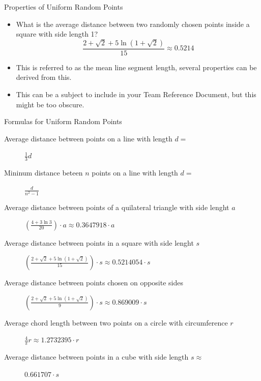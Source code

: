 \documentclass[11pt,pdf, aspectratio=169]{beamer}
\begin{document}
  \begin{frame}{Properties of Uniform Random Points}
    \begin{itemize}
      \item What is the average distance between two randomly chosen points inside a square with side length 1?\\
      \[
        \frac{2 + \sqrt {2} + 5 \ln\left(1 + \sqrt {2}\right)}{15} \approx 0.5214
      \]
      \item This is referred to as the mean line segment length, several properties can be derived from this.
      \item This can be a subject to include in your Team Reference Document, but this might be too obscure.
    \end{itemize}
  \end{frame}
  \begin{frame}{Formulas for Uniform Random Points} %
    \begin{description}
      \item[Average distance between points on a line with length $d=$] $\frac{1}{3}d$
      \item[Mininum distance beteen $n$ points on a line with length $d=$]$\frac{d}{n^2-1}$
      \item[Average distance between points of a quilateral triangle with side lenght $a$] $\left( \frac{4 + 3 \ln 3}{20} \right)\cdot a \approx 0.3647918\cdot a$
      \item[Average distance between points in a square with side lenght $s$] $\left(\frac{2 + \sqrt {2} + 5 \ln\left(1 + \sqrt {2}\right)}{15} \right)\cdot s \approx 0.5214054\cdot s$
      \item[Average distance between points chosen on opposite sides] $\left(\frac{2 + \sqrt {2} + 5 \ln\left(1 + \sqrt {2}\right)}{9} \right)\cdot s \approx 0.869009\cdot s$
      \item[Average chord length between two points on a circle with circumference $r$] $\frac{4}{\pi}r \approx 1.2732395 \cdot r$
      \item[Average distance between points in a cube with side length $s\approx$] $0.661707\cdot s$ %
    \end{description}
  \end{frame}
\end{document}
